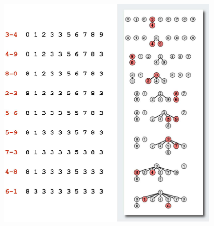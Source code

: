 \begin{figure}[h]
    \begin{center}
        \includegraphics[width=120mm]{02/images/union-find}
    \end{center}
\end{figure}
